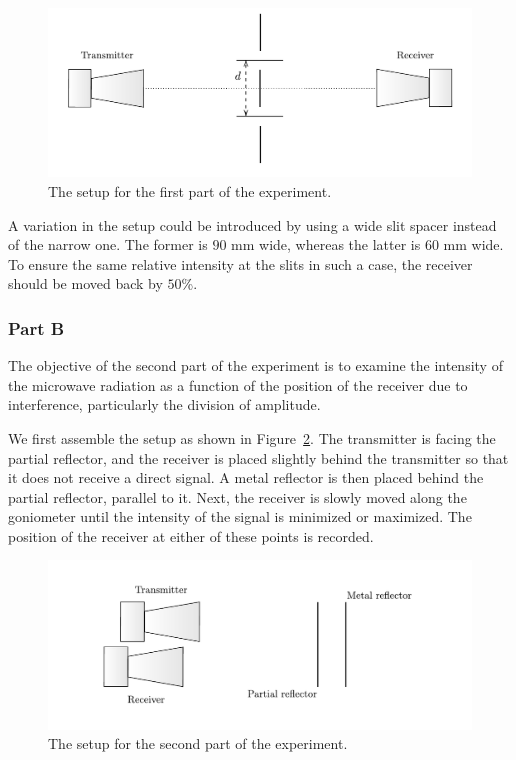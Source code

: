 \documentclass[10pt]{article}
\begin{document}
\begin{figure}[hbt!]
  \centering
  \includegraphics[scale=0.6]{figures/f1.pdf}
  \caption{The setup for the first part of the experiment.}
  \label{fig:1}
\end{figure}

A variation in the setup could be introduced by using a wide slit spacer instead of the narrow one. The former is $90$ mm wide, whereas the latter is $60$ mm wide. To ensure the same relative intensity at the slits in such a case, the receiver should be moved back by $50$\%.

\subsubsection*{Part B}

The objective of the second part of the experiment is to examine the intensity of the microwave radiation as a function of the position of the receiver due to interference, particularly the division of amplitude.

We first assemble the setup as shown in Figure~\ref{fig:2}. The transmitter is facing the partial reflector, and the receiver is placed slightly behind the transmitter so that it does not receive a direct signal. A metal reflector is then placed behind the partial reflector, parallel to it. Next, the receiver is slowly moved along the goniometer until the intensity of the signal is minimized or maximized. The position of the receiver at either of these points is recorded. 

\begin{figure}[hbt!]
  \centering
  \includegraphics[scale=0.6]{figures/f2.pdf}
  \caption{The setup for the second part of the experiment.}
  \label{fig:2}
\end{figure}
\end{document}

